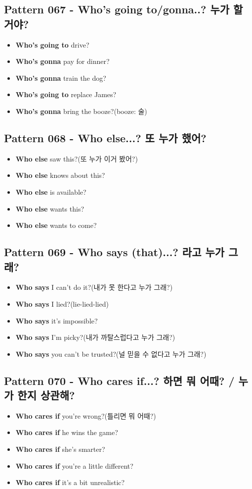 \documentclass[11pt]{oblivoir}
\begin{document}
\subsection{Pattern 067 - Who's going to/gonna..? 누가 \texttildelow 할 거야?}
\begin{itemize}
  \item \textbf{Who's going to} drive?
  \item \textbf{Who's gonna} pay for dinner?
  \item \textbf{Who's gonna} train the dog?
  \item \textbf{Who's going to} replace James?
  \item \textbf{Who's gonna} bring the booze?(booze: 술)
\end{itemize}

\subsection{Pattern 068 - Who else...? 또 누가 \texttildelow 했어?}
\begin{itemize}
  \item \textbf{Who else} saw this?(또 누가 이거 봤어?)
  \item \textbf{Who else} knows about this?
  \item \textbf{Who else} is available?
  \item \textbf{Who else} wants this?
  \item \textbf{Who else} wants to come?
\end{itemize}

\subsection{Pattern 069 - Who says (that)...? \texttildelow 라고 누가 그래?}
\begin{itemize}
  \item \textbf{Who says} I can't do it?(내가 못 한다고 누가 그래?)
  \item \textbf{Who says} I lied?(lie-lied-lied)
  \item \textbf{Who says} it's impossible?
  \item \textbf{Who says} I'm picky?(내가 까탈스럽다고 누가 그래?)
  \item \textbf{Who says} you can't be trusted?(널 믿을 수 없다고 누가 그래?)
\end{itemize}

\subsection{Pattern 070 - Who cares if...? \texttildelow 하면 뭐 어때? / 누가 \texttildelow 한지 상관해?}
\begin{itemize}
  \item \textbf{Who cares if} you're wrong?(틀리면 뭐 어때?)
  \item \textbf{Who cares if} he wins the game?
  \item \textbf{Who cares if} she's smarter?
  \item \textbf{Who cares if} you're a little different?
  \item \textbf{Who cares if} it's a bit unrealistic?
\end{itemize}
\end{document}

